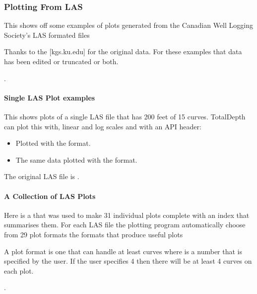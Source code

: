 \documentclass[letterpaper,10pt,english]{sphinxmanual}
\begin{document}
\subsubsection{Plotting From LAS}
\label{\detokenize{examples/examples:plotting-from-las}}
This shows off some examples of plots generated from the Canadian Well Logging Society’s LAS formated files %
\begin{footnote}[2]\sphinxAtStartFootnote
Thanks to the  {[}kgs.ku.edu{]} for the original data. For these examples that data has been edited or truncated or both.
%
\end{footnote}.


\paragraph{Single LAS Plot examples}
\label{\detokenize{examples/examples:single-las-plot-examples}}
This shows plots of a single LAS file that has 200 feet of 15 curves. TotalDepth can plot this with, linear and log scales and with an API header:
\begin{itemize}
\item {} 
Plotted with the  format.

\item {} 
The same data plotted with the  format.

\end{itemize}

The original LAS file is .


\paragraph{A Collection of LAS Plots}
\label{\detokenize{examples/examples:a-collection-of-las-plots}}
Here is a  that was used to make 31 individual plots complete with an index that summarises them. For each LAS file the plotting program automatically choose from 29 plot formats the formats that produce useful plots %
\begin{footnote}[3]\sphinxAtStartFootnote
A  plot format is one that can handle at least  curves where  is a number that is specified by the user. If the user specifies 4 then there will be at least 4 curves on each plot.
%
\end{footnote}.
\end{document}

